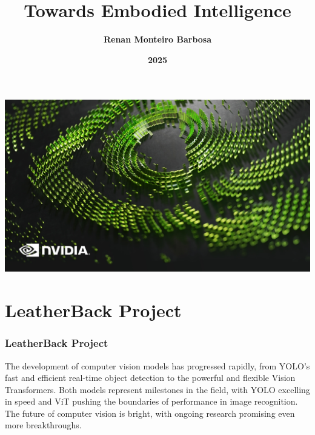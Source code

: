 \documentclass{beamer}
\begin{document}
{
{
    \includegraphics[width=\paperwidth,height=\paperheight]{images/Screenshot_9-12-2024_212019_.jpeg}
}
\title{\textbf{Towards Embodied Intelligence}}
\author[]{\textbf{Renan Monteiro Barbosa}}
\date[]{\textbf{2025}}
\maketitle
}


\section{LeatherBack Project}
\begin{frame}
\frametitle{\textbf{LeatherBack Project} }
The development of computer vision models has progressed rapidly, from YOLO’s fast and efficient real-time object detection to the powerful and flexible Vision Transformers. Both models represent milestones in the field, with YOLO excelling in speed and ViT pushing the boundaries of performance in image recognition. The future of computer vision is bright, with ongoing research promising even more breakthroughs.
\end{frame}

\end{document}
